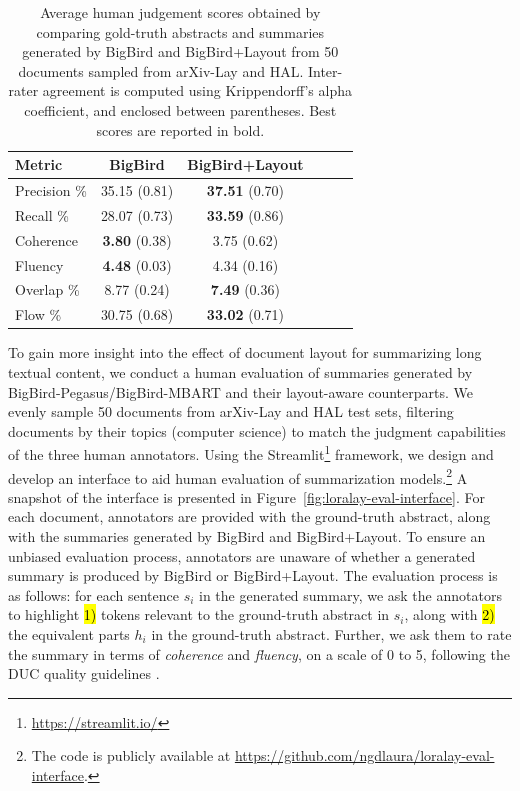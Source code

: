 \begin{table}
\centering
\small
\begin{tabular}{lccccc}
\toprule
\textbf{Metric}        & \textbf{BigBird} & \textbf{BigBird+Layout} \\ 
\midrule
Precision \%    &    35.15 \scriptsize{(0.81)}            &      \textbf{37.51} \scriptsize{(0.70)}                   \\
Recall \%       &    28.07 \scriptsize{(0.73)}             &     \textbf{33.59} \scriptsize{(0.86)}                   \\
Coherence     &     \textbf{3.80} \scriptsize{(0.38)}             &      3.75 \scriptsize{(0.62)}                   \\ 
Fluency       &     \textbf{4.48} \scriptsize{(0.03)}             &      4.34 \scriptsize{(0.16)}                   \\
Overlap \%     &    8.77 \scriptsize{(0.24)}             &     \textbf{7.49} \scriptsize{(0.36)}                    \\ 
Flow \%             &   30.75 \scriptsize{(0.68)}          &    \textbf{33.02} \scriptsize{(0.71)}                     \\
\bottomrule
\end{tabular}
\caption{Average human judgement scores obtained by comparing gold-truth abstracts and summaries generated by BigBird and BigBird+Layout from 50 documents sampled from arXiv-Lay and HAL. Inter-rater agreement	is computed using Krippendorff's alpha coefficient, and enclosed between parentheses. Best scores are reported in bold.}
\label{table:human-eval-scores}
\end{table}

To gain more insight into the effect of document layout for summarizing long textual content, we conduct a human evaluation of summaries generated by BigBird-Pegasus/BigBird-MBART and their layout-aware counterparts. We evenly sample 50 documents from arXiv-Lay and HAL test sets, filtering documents by their topics (computer science) to match the judgment capabilities of the three human annotators. 
Using the Streamlit\footnote{\url{https://streamlit.io/}} framework, we design and develop an interface to aid human evaluation of summarization models.\footnote{The code is publicly available at \url{https://github.com/ngdlaura/loralay-eval-interface}.} A snapshot of the interface is presented in Figure~\ref{fig:loralay-eval-interface}. For each document, annotators are provided with the ground-truth abstract, along with the summaries generated by BigBird and BigBird+Layout. To ensure an unbiased evaluation process, annotators are unaware of whether a generated summary is produced by BigBird or BigBird+Layout. The evaluation process is as follows: for each sentence $s_i$ in the generated summary, we ask the annotators to highlight \hl{1)} tokens relevant to the ground-truth abstract in $s_i$, along with \hl{2)} the equivalent parts $h_i$ in the ground-truth abstract. Further, we ask them to rate the summary in terms of \textit{coherence} and \textit{fluency}, on a scale of 0 to 5, following the DUC quality guidelines \citep{dang2005overview}. 

